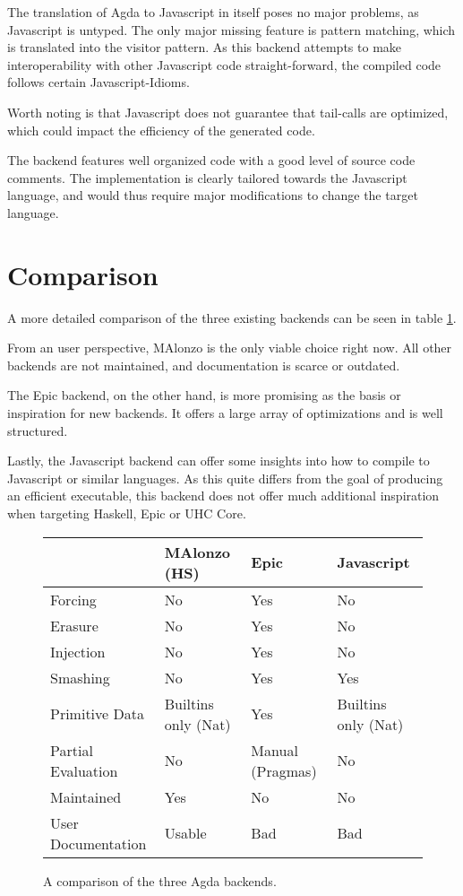\documentclass[12pt, a4paper, twoside]{report}
\begin{document}
The translation of Agda to Javascript in itself poses no major problems, as Javascript is untyped. The
only major missing feature is pattern matching, which is translated into the visitor pattern.
As this backend attempts to make interoperability
with other Javascript code straight-forward, the compiled code follows certain Javascript-Idioms.

Worth noting is that Javascript does not guarantee that tail-calls are optimized, which could impact
the efficiency of the generated code.

The backend features well organized code with a good level of source code comments. The implementation
is clearly tailored towards the Javascript language, and would thus require major modifications to change the
target language.


\section{Comparison}
A more detailed comparison of the three existing backends can be seen in table \ref{tbl:backends-comp}.

From an user perspective, MAlonzo is the only viable choice right now. All other backends
are not maintained, and documentation is scarce or outdated.

The Epic backend, on the other hand, is more promising as the basis or inspiration for new backends.
It offers a large array of optimizations and is well structured.

Lastly, the Javascript backend can offer some insights into how to
compile to Javascript or similar languages. As this quite differs from
the goal of producing an efficient executable, this backend does not offer much
additional inspiration when targeting Haskell, Epic or UHC Core.

\begin{figure}
\begin{tabular}{l | l | l | l}
& MAlonzo (HS) & Epic & Javascript \\
\hline
Forcing & No & Yes & No \\
Erasure & No & Yes & No \\
Injection & No & Yes & No \\
Smashing & No & Yes & Yes \\
Primitive Data & Builtins only (Nat) & Yes & Builtins only (Nat) \\
Partial Evaluation & No & Manual (Pragmas) & No \\
\hline
Maintained & Yes & No & No \\
User Documentation & Usable & Bad & Bad \\
\hline
\end{tabular}
\caption{A comparison of the three Agda backends.}
\label{tbl:backends-comp}
\end{figure}
\end{document}
